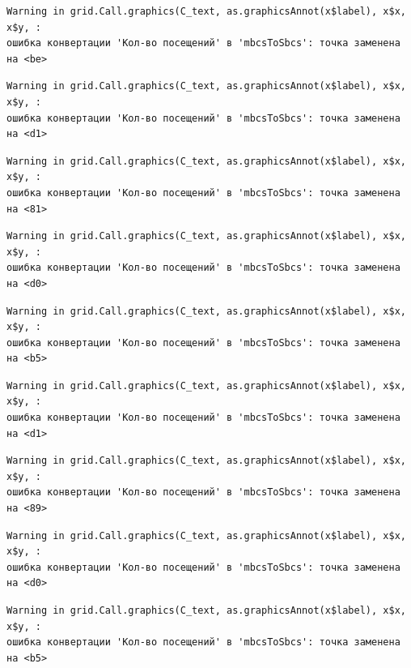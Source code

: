 \documentclass[
  letterpaper,
  DIV=11,
  numbers=noendperiod]{scrreprt}
\begin{document}
\begin{verbatim}
Warning in grid.Call.graphics(C_text, as.graphicsAnnot(x$label), x$x, x$y, :
ошибка конвертации 'Кол-во посещений' в 'mbcsToSbcs': точка заменена на <be>
\end{verbatim}

\begin{verbatim}
Warning in grid.Call.graphics(C_text, as.graphicsAnnot(x$label), x$x, x$y, :
ошибка конвертации 'Кол-во посещений' в 'mbcsToSbcs': точка заменена на <d1>
\end{verbatim}

\begin{verbatim}
Warning in grid.Call.graphics(C_text, as.graphicsAnnot(x$label), x$x, x$y, :
ошибка конвертации 'Кол-во посещений' в 'mbcsToSbcs': точка заменена на <81>
\end{verbatim}

\begin{verbatim}
Warning in grid.Call.graphics(C_text, as.graphicsAnnot(x$label), x$x, x$y, :
ошибка конвертации 'Кол-во посещений' в 'mbcsToSbcs': точка заменена на <d0>
\end{verbatim}

\begin{verbatim}
Warning in grid.Call.graphics(C_text, as.graphicsAnnot(x$label), x$x, x$y, :
ошибка конвертации 'Кол-во посещений' в 'mbcsToSbcs': точка заменена на <b5>
\end{verbatim}

\begin{verbatim}
Warning in grid.Call.graphics(C_text, as.graphicsAnnot(x$label), x$x, x$y, :
ошибка конвертации 'Кол-во посещений' в 'mbcsToSbcs': точка заменена на <d1>
\end{verbatim}

\begin{verbatim}
Warning in grid.Call.graphics(C_text, as.graphicsAnnot(x$label), x$x, x$y, :
ошибка конвертации 'Кол-во посещений' в 'mbcsToSbcs': точка заменена на <89>
\end{verbatim}

\begin{verbatim}
Warning in grid.Call.graphics(C_text, as.graphicsAnnot(x$label), x$x, x$y, :
ошибка конвертации 'Кол-во посещений' в 'mbcsToSbcs': точка заменена на <d0>
\end{verbatim}

\begin{verbatim}
Warning in grid.Call.graphics(C_text, as.graphicsAnnot(x$label), x$x, x$y, :
ошибка конвертации 'Кол-во посещений' в 'mbcsToSbcs': точка заменена на <b5>
\end{verbatim}
\end{document}
